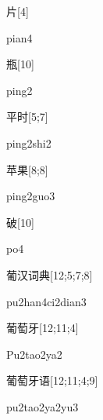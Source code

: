 \begin{verbete}[pian4]{片}[4]
\begin{pronuncia}{pian4}
\end{pronuncia}
\end{verbete}

\begin{verbete}[ping2]{瓶}[10]
\begin{pronuncia}{ping2}
\end{pronuncia}
\end{verbete}

\begin{verbete}{平时}[5;7]
\begin{pronuncia}{ping2shi2}
\end{pronuncia}
\end{verbete}

\begin{verbete}{苹果}[8;8]
\begin{pronuncia}{ping2guo3}
\end{pronuncia}
\end{verbete}

\begin{verbete}[po4]{破}[10]
\begin{pronuncia}{po4}
\end{pronuncia}
\end{verbete}

\begin{verbete}{葡汉词典}[12;5;7;8]
\begin{pronuncia}[\\]{pu2han4ci2dian3}
\end{pronuncia}
\end{verbete}

\begin{verbete}[Pu2tao2ya2]{葡萄牙}[12;11;4]
\begin{pronuncia}{Pu2tao2ya2}
\end{pronuncia}
\end{verbete}

\begin{verbete}[pu2tao2ya2yu3]{葡萄牙语}[12;11;4;9]
\begin{pronuncia}[\\]{pu2tao2ya2yu3}
\end{pronuncia}
\end{verbete}

